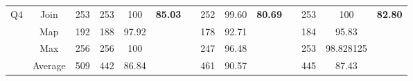 \begin{table}
\begin{tabular}{cccccclccclccc}
\multirow{4}{*}{Q4}             & Join                                & 253                                   & 253                                                                    & 100                                                                       & \multirow{4}{*}{\textbf{85.03}} &                      & 252                                                                    & 99.60                                                                     & \multirow{4}{*}{\textbf{80.69}} &                      & 253                                                                    & 100                                                                       & \multirow{4}{*}{\textbf{82.80}} \\
                                & Map                                 & 192                                   & 188                                                                    & 97.92                                                                     &                                 & \multicolumn{1}{c}{} & 178                                                                    & 92.71                                                                     &                                 & \multicolumn{1}{c}{} & 184                                                                    & 95.83                                                                     &                                 \\
                                & Max                                 & 256                                   & 256                                                                    & 100                                                                       &                                 & \multicolumn{1}{c}{} & 247                                                                    & 96.48                                                                     &                                 & \multicolumn{1}{c}{} & 253                                                                    & 98.828125                                                                 &                                 \\
                                & Average                             & 509                                   & 442                                                                    & 86.84                                                                     &                                 & \multicolumn{1}{c}{} & 461                                                                    & 90.57                                                                     &                                 & \multicolumn{1}{c}{} & 445                                                                    & 87.43                                                                     &                                 \\ \hline

\end{tabular}
\end{table}
